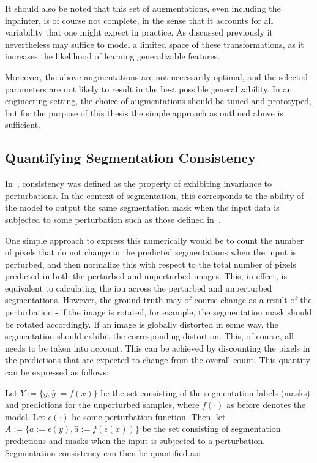 It should also be noted that this set of augmentations, even including the inpainter, is of course not complete, in the sense that it accounts for all variability that one might expect in practice. As discussed previously it nevertheless may suffice to model a limited space of these transformations, as it increases the likelihood of learning generalizable features. 

Moreover, the above augmentations are not necessarily optimal, and the selected parameters are not likely to result in the best possible generalizability. In an engineering setting, the choice of augmentations should be tuned and prototyped, but for the purpose of this thesis the simple approach as outlined above is sufficient. 


\subsection{Quantifying Segmentation Consistency}

In~, consistency was defined as the property of exhibiting invariance to perturbations. In the context of segmentation, this corresponds to the ability of the model to output the same segmentation mask when the input data is subjected to some perturbation such as those defined in~.

One simple approach to express this numerically would be to count the number of pixels that do not change in the predicted segmentations when the input is perturbed, and then normalize this with respect to the total number of pixels predicted in both the perturbed and unperturbed images. This, in effect, is equivalent to calculating the \gls{iou} across the perturbed and unperturbed segmentations. However, the ground truth may of course change as a result of the perturbation - if the image is rotated, for example, the segmentation mask should be rotated accordingly. If an image is globally distorted in some way, the segmentation should exhibit the corresponding distortion. This, of course, all needs to be taken into account. This can be achieved by discounting the pixels in the predictions that are expected to change from the overall count. This quantity can be expressed as follows:

Let \(Y:=\{y,\hat{y}:=f(x)\}\) be the set consisting of the segmentation labels (masks) and predictions for the unperturbed samples, where \(f(\cdot)\) as before denotes the model. Let \(\epsilon(\cdot)\) be some perturbation function. Then, let \(A:=\{a:=\epsilon(y),\hat{a}:=f(\epsilon(x))\}\) be the set consisting of segmentation predictions and masks when the input is subjected to a perturbation. Segmentation consistency can then be quantified as:

